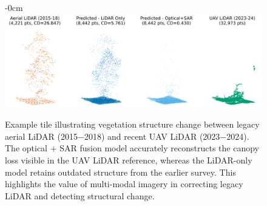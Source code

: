 \documentclass[remotesensing,article,accept,pdftex,moreauthors]{Definitions/mdpi}
\renewcommand{\hl}[1]{#1}
\begin{document}
\begin{figure}[H]
\begin{adjustwidth}{-\extralength}{0cm}
    \centering
    \includegraphics[width=0.85\linewidth]{figures/single_veg_loss_example.png}
    \end{adjustwidth}
    \caption{\hl{Example} %
 tile illustrating vegetation structure change between legacy aerial LiDAR (\mbox{2015−2018}) and recent UAV LiDAR (2023−2024). The optical + SAR fusion model accurately reconstructs the canopy loss visible in the UAV LiDAR reference, whereas the LiDAR-only model retains outdated structure from the earlier survey. This highlights the value of multi-modal imagery in correcting legacy LiDAR and detecting structural change.}
    \label{fig:single_veg_loss_example}
\end{figure}


\vspace{-11pt}
\end{document}
